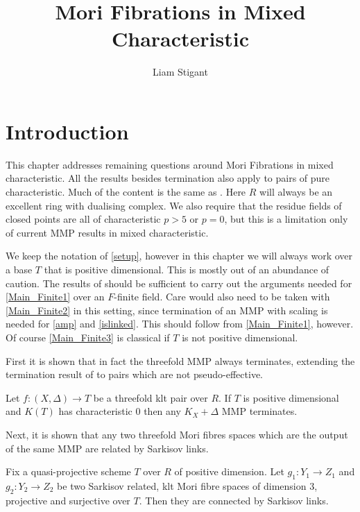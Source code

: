 \documentclass[a4paper,12pt]{amsart}
\title{Mori Fibrations in Mixed Characteristic}
\author{Liam Stigant}
\begin{document}
		
	\section{Introduction}
	
	This chapter addresses remaining questions around Mori Fibrations in mixed characteristic. All the results besides termination also apply to pairs of pure characteristic. Much of the content is the same as \cite{}. Here $R$ will always be an excellent ring with dualising complex. We also require that the residue fields of closed points are all of characteristic $p>5$ or $p=0$, but this is a limitation only of current MMP results in mixed characteristic.
	
	We keep the notation of \autoref{setup}, however in this chapter we will always work over a base $T$ that is positive dimensional. This is mostly out of an abundance of caution. The results of \cite{DW19} should be sufficient to carry out the arguments needed for \autoref{Main_Finite1} over an $F$-finite field. Care would also need to be taken with \autoref{Main_Finite2} in this setting, since termination of an MMP with scaling is needed for \autoref{amp} and \autoref{islinked}. This should follow from \autoref{Main_Finite1}, however. Of course \autoref{Main_Finite3} is classical if $T$ is not positive dimensional.
	
	First it is shown that in fact the threefold MMP always terminates, extending the termination result of \cite{bhatt2020globally+} to pairs which are not pseudo-effective.
	
	\begin{theorem}\label{Main_Finite3}
		Let $f:(X,\Delta) \to T$ be a threefold klt pair over $R$. If $T$ is positive dimensional and $K(T)$ has characteristic $0$ then any $K_{X}+\Delta$ MMP terminates.
	\end{theorem}

	Next, it is shown that any two threefold Mori fibres spaces which are the output of the same MMP are related by Sarkisov links.
	
	\begin{theorem}\label{Main_Finite2}
		Fix a quasi-projective scheme $T$ over $R$ of positive dimension. Let $g_{1}:Y_{1} \to Z_{1}$ and $g_{2}:Y_{2} \to Z_{2}$ be two Sarkisov related, klt Mori fibre spaces of dimension $3$, projective and surjective over $T$. Then they are connected by Sarkisov links.
	\end{theorem}
	
\end{document}
